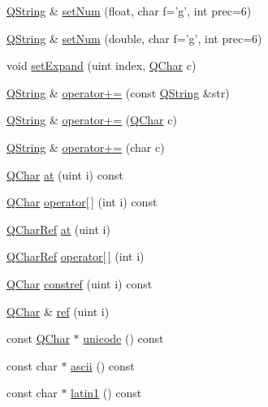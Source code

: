 \begin{DoxyCompactItemize}
\item 
\hyperlink{class_q_string}{Q\-String} \& \hyperlink{class_q_string_aadec55751874a59aaeb7cd33eec517db}{set\-Num} (float, char f='g', int prec=6)
\item 
\hyperlink{class_q_string}{Q\-String} \& \hyperlink{class_q_string_a15d7f3484c04c35c2f11b111bfe63e20}{set\-Num} (double, char f='g', int prec=6)
\item 
void \hyperlink{class_q_string_af2a2e57d170e954267da4cb14fa6736d}{set\-Expand} (uint index, \hyperlink{class_q_char}{Q\-Char} c)
\item 
\hyperlink{class_q_string}{Q\-String} \& \hyperlink{class_q_string_ae644e94debcc43991ec46688a3d3551f}{operator+=} (const \hyperlink{class_q_string}{Q\-String} \&str)
\item 
\hyperlink{class_q_string}{Q\-String} \& \hyperlink{class_q_string_abd0d9d2cb4725eb0cadaf2e019774bc4}{operator+=} (\hyperlink{class_q_char}{Q\-Char} c)
\item 
\hyperlink{class_q_string}{Q\-String} \& \hyperlink{class_q_string_a61f4f43d92f528d4623e300754016322}{operator+=} (char c)
\item 
\hyperlink{class_q_char}{Q\-Char} \hyperlink{class_q_string_aeab82c39fe3254c6b27681d55419885f}{at} (uint i) const 
\item 
\hyperlink{class_q_char}{Q\-Char} \hyperlink{class_q_string_aaa5543be6fc9dffc6354e4e15a80405c}{operator\mbox{[}$\,$\mbox{]}} (int i) const 
\item 
\hyperlink{class_q_char_ref}{Q\-Char\-Ref} \hyperlink{class_q_string_adb3010fb2dd03189d1f3dc4f745feb74}{at} (uint i)
\item 
\hyperlink{class_q_char_ref}{Q\-Char\-Ref} \hyperlink{class_q_string_a915ff18570b2ac730154871f7cd440d2}{operator\mbox{[}$\,$\mbox{]}} (int i)
\item 
\hyperlink{class_q_char}{Q\-Char} \hyperlink{class_q_string_a409bb66f101af0286f3080feec9f2d13}{constref} (uint i) const 
\item 
\hyperlink{class_q_char}{Q\-Char} \& \hyperlink{class_q_string_a24a2c9b9ad269505bef65972756dbeac}{ref} (uint i)
\item 
const \hyperlink{class_q_char}{Q\-Char} $\ast$ \hyperlink{class_q_string_a65a250696de2e5cb83a8e01a9603cea0}{unicode} () const 
\item 
const char $\ast$ \hyperlink{class_q_string_aadbdae41cf9c6012031dc7996985e1f6}{ascii} () const 
\item 
const char $\ast$ \hyperlink{class_q_string_ae1632b670a4297db36e3d0228171a3b6}{latin1} () const 

\end{DoxyCompactItemize}
